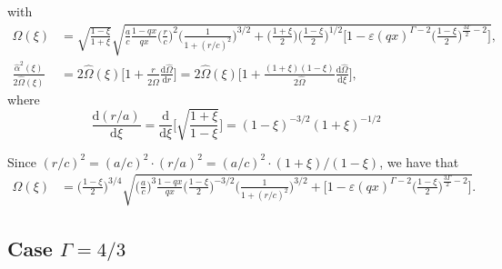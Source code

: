 \documentclass[11pt]{article}
\newcommand{\rd}{\mathrm{d}}
\newcommand{\hOmega}{\widehat{\Omega}}
\newcommand{\halpha}{\widehat{\alpha}}
\begin{document}
with
\begin{align*}
\hOmega(\xi) &=\sqrt{\frac{1-\xi}{1+\xi}} \sqrt{\frac{a}{c}\frac{1-qx}{qx}\bigg( \frac{r}{c}\bigg)^2 \bigg(\frac{1}{1+(r/c)^2}\bigg)^{3/2} 
+ \bigg(\frac{1+\xi}{2}\bigg) \bigg(\frac{1-\xi}{2}\bigg)^{1/2}  \bigg[1- \varepsilon(qx)^{\Gamma-2}\bigg(\frac{1-\xi}{2}\bigg)^{\frac{3\Gamma}{2}-2} \bigg] } ,\\
\frac{\halpha^2(\xi)}{2\hOmega(\xi)} &= 2\hOmega(\xi) \bigg[1+\frac{r}{2\hOmega}\frac{\rd \hOmega }{\rd r}\bigg] = 2\hOmega(\xi) \bigg[1+\frac{(1+\xi)(1-\xi)}{2\hOmega}\frac{\rd \hOmega }{\rd \xi} \bigg],
\end{align*}
where
$$\frac{\rd(r/a)}{\rd \xi} = \frac{\rd}{\rd \xi} \bigg[\sqrt{\frac{1+\xi}{1-\xi}}\bigg] = (1-\xi)^{-3/2}(1+\xi)^{-1/2}$$

Since $(r/c)^2 = (a/c)^2 \cdot (r/a)^2 =  (a/c)^2 \cdot (1+\xi)/(1-\xi)$, we have that
\begin{align*}
\hOmega(\xi) &=\bigg(\frac{1-\xi}{2}\bigg)^{3/4}  \sqrt{\bigg( \frac{a}{c}\bigg)^3\frac{1-qx}{qx} \bigg(\frac{1-\xi}{2}\bigg)^{-3/2} \bigg(\frac{1}{1+(r/c)^2}\bigg)^{3/2} 
+   \bigg[1- \varepsilon(qx)^{\Gamma-2}\bigg(\frac{1-\xi}{2}\bigg)^{\frac{3\Gamma}{2}-2} \bigg] } .
\end{align*}

\subsection{Case $\Gamma=4/3$}
\end{document}
